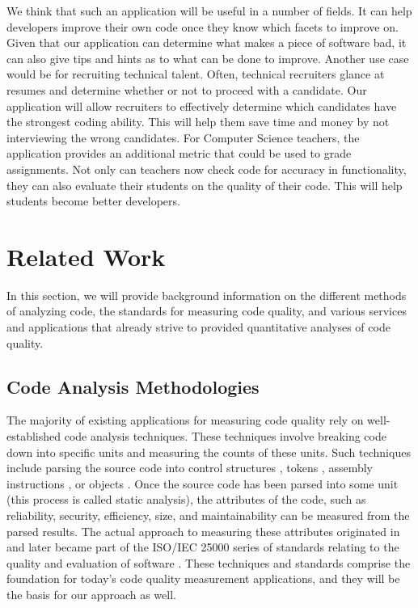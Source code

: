 \documentclass{sig-alternate}
\begin{document}
We think that such an application will be useful in a number of fields. It can help developers improve their own code once they know which facets to improve on. Given that our application can determine what makes a piece of software bad, it can also give tips and hints as to what can be done to improve. Another use case would be for recruiting technical talent. Often, technical recruiters glance at resumes and determine whether or not to proceed with a candidate. Our application will allow recruiters to effectively determine which candidates have the strongest coding ability. This will help them save time and money by not interviewing the wrong candidates. For Computer Science teachers, the application provides an additional metric that could be used to grade assignments. Not only can teachers now check code for accuracy in functionality, they can also evaluate their students on the quality of their code. This will help students become better developers.

\section{Related Work}
\label{sec:related_work}
In this section, we will provide background information on the different methods of analyzing code, the standards for measuring code quality, and various services and applications that already strive to provided quantitative analyses of code quality.

\subsection{Code Analysis Methodologies}
The majority of existing applications for measuring code quality rely on well-established code analysis techniques. These techniques involve breaking code down into specific units and measuring the counts of these units. Such techniques include parsing the source code into control structures \cite{mccabe1976complexity}, tokens \cite{halstead1977elements}, assembly instructions \cite{park1992software}, or objects \cite{chidamber1994metrics}. Once the source code has been parsed into some unit (this process is called static analysis), the attributes of the code, such as reliability, security, efficiency, size, and maintainability can be measured from the parsed results. The actual approach to measuring these attributes originated in \cite{boehm1976quantitative} and later became part of the ISO/IEC 25000 series of standards relating to the quality and evaluation of software \cite{iso2011iec}. These techniques and standards comprise the foundation for today's code quality measurement applications, and they will be the basis for our approach as well.
\end{document}
